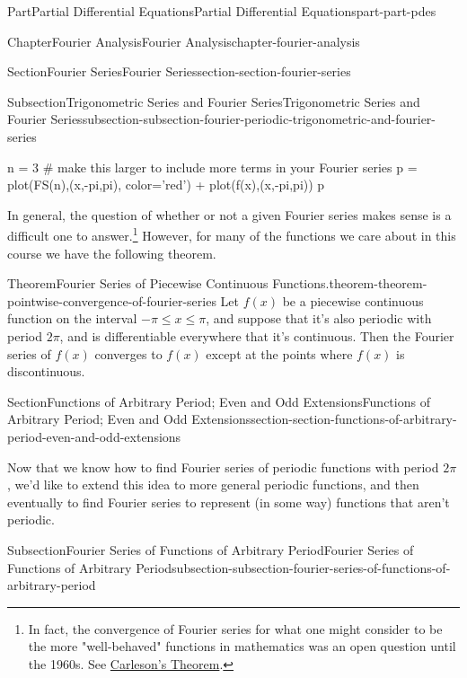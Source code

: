 \documentclass[twoside,10pt,]{book}
\numberwithin{equation}{part}
\begin{document}
\begin{partptx}{Part}{Partial Differential Equations}{}{Partial Differential Equations}{}{}{part-part-pdes}
\begin{chapterptx}{Chapter}{Fourier Analysis}{}{Fourier Analysis}{}{}{chapter-fourier-analysis}
\begin{sectionptx}{Section}{Fourier Series}{}{Fourier Series}{}{}{section-section-fourier-series}
\begin{subsectionptx}{Subsection}{Trigonometric Series and Fourier Series}{}{Trigonometric Series and Fourier Series}{}{}{subsection-subsection-fourier-periodic-trigonometric-and-fourier-series}
\begin{sageinput}
n = 3 # make this larger to include more terms in your Fourier series
p = plot(FS(n),(x,-pi,pi), color='red') + plot(f(x),(x,-pi,pi))
p
\end{sageinput}
In general, the question of whether or not a given Fourier series makes sense is a difficult one to answer.\footnote{In fact, the convergence of Fourier series for what one might consider to be the more "well-behaved" functions in mathematics was an open question until the 1960s. See \href{https://en.wikipedia.org/wiki/Carleson\%27s_theorem}{Carleson's Theorem}.\label{fn-footnote-convergence-of-fourier-series}} However, for many of the functions we care about in this course we have the following theorem.%
\begin{theorem}{Theorem}{Fourier Series of Piecewise Continuous Functions.}{}{theorem-theorem-pointwise-convergence-of-fourier-series}%
%
Let \(f(x)\) be a piecewise continuous function on the interval \(-\pi\leq x\leq\pi\), and suppose that it's also periodic with period \(2\pi\), and is differentiable everywhere that it's continuous. Then the Fourier series of \(f(x)\) converges to \(f(x)\) except at the points where \(f(x)\) is discontinuous.%
\end{theorem}
\end{subsectionptx}
\end{sectionptx}
%
%
\typeout{************************************************}
\typeout{************************************************}
%
\begin{sectionptx}{Section}{Functions of Arbitrary Period; Even and Odd Extensions}{}{Functions of Arbitrary Period; Even and Odd Extensions}{}{}{section-section-functions-of-arbitrary-period-even-and-odd-extensions}
\begin{introduction}{}%
Now that we know how to find Fourier series of periodic functions with period \(2\pi\), we'd like to extend this idea to more general periodic functions, and then eventually to find Fourier series to represent (in some way) functions that aren't periodic.%
\end{introduction}%
%
%
\typeout{************************************************}
\typeout{************************************************}
%
\begin{subsectionptx}{Subsection}{Fourier Series of Functions of Arbitrary Period}{}{Fourier Series of Functions of Arbitrary Period}{}{}{subsection-subsection-fourier-series-of-functions-of-arbitrary-period}

\end{subsectionptx}
\end{sectionptx}
\end{chapterptx}
\end{partptx}
\end{document}

